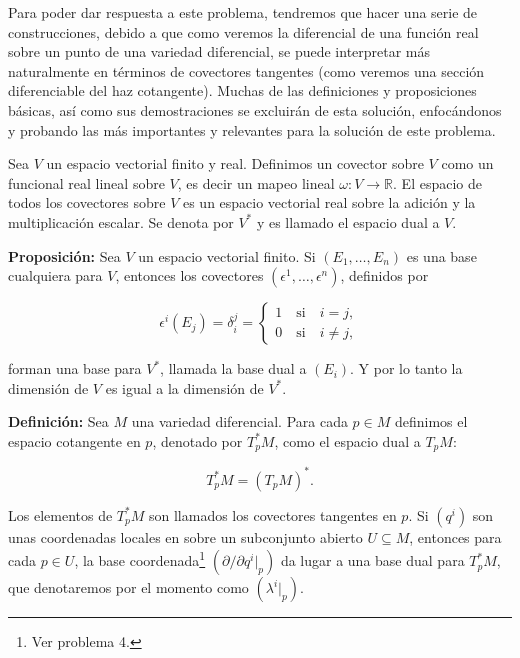 \documentclass[a4paper,10pt]{article}
\numberwithin{equation}{section}
\newcommand{\definicion}{\textbf{Definición: }}
\newcommand{\proposicion}{\textbf{Proposición: }}
\begin{document}
Para poder dar respuesta a este problema, tendremos que hacer una serie de construcciones, 
debido a que como veremos la diferencial de una función real sobre un punto de 
una variedad diferencial, se puede interpretar más naturalmente en términos de 
covectores tangentes (como veremos una sección diferenciable del haz cotangente). Muchas 
de las definiciones y proposiciones básicas, así como sus demostraciones se excluirán de esta solución, enfocándonos 
y probando las más importantes y relevantes para la solución de este problema.

\vspace{.3cm}

Sea $V$ un espacio vectorial finito y real. Definimos un covector sobre $V$ como 
un funcional real lineal sobre $V$, es decir un mapeo lineal $ \omega: V \rightarrow 
\mathbb{R}$. El espacio de todos los covectores sobre $V$ es un espacio vectorial 
real sobre la adición y la multiplicación escalar. Se denota por $V^*$ y es llamado 
el espacio dual a $V$.

\vspace{.3cm}

\proposicion Sea $V$ un espacio vectorial finito. Si $(E_1,\dots,E_n)$ es una base 
cualquiera para $V$, entonces los covectores $(\epsilon^1,\dots,\epsilon^n)$, 
definidos por 

\begin{equation}
 \epsilon^i(E_j) = \delta_i^j = \begin{cases}
                                 1 \quad \text{si} \quad i=j, \\
                                 0 \quad \text{si} \quad i\ne j,
                                \end{cases}
\end{equation}

forman una base para $V^*$, llamada la base dual a $(E_i)$. Y por lo tanto la 
dimensión de $V$ es igual a la dimensión de $V^*$.

\vspace{.3cm}

\definicion Sea $M$ una variedad diferencial. Para cada $p \in M$ definimos el 
espacio cotangente en $p$, denotado por $T_p^* M$, como el espacio dual a $T_p M$:

\begin{equation}
 T_p^* M = (T_p M)^*.
\end{equation}

Los elementos de $T_p^* M$ son llamados los covectores tangentes en $p$. Si $(q^i)$ 
son unas coordenadas locales en sobre un subconjunto abierto $U \subseteq M$, entonces 
para cada $p \in U$, la base coordenada\footnote{Ver problema 4.} $(\partial/\partial q^i|_p)$ 
da lugar a una base dual para $T_p^* M$, que denotaremos por el momento como 
$(\lambda^i|_p)$.
\end{document}
